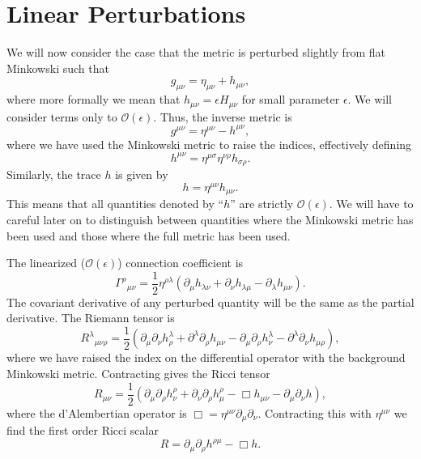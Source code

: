 \documentclass[a4paper, 11pt, titlepage, twoside]{report}
\newcommand{\order}[1]{\ensuremath{\mathcal{O}({#1})}}
\begin{document}
\section{Linear Perturbations}\label{sec:Lin}

We will now consider the case that the metric is perturbed slightly from flat Minkowski such that
\begin{equation}
g_{\mu\nu} = \eta_{\mu\nu} + h_{\mu\nu},
\end{equation}
where more formally we mean that $h_{\mu\nu} = \epsilon H_{\mu\nu}$ for small parameter $\epsilon$. We will consider terms only to $\order{\epsilon}$. Thus, the inverse metric is
\begin{equation}
g^{\mu\nu} = \eta^{\mu\nu} - h^{\mu\nu},
\end{equation}
where we have used the Minkowski metric to raise the indices, effectively defining
\begin{equation}
h^{\mu\nu} = \eta^{\mu\sigma}\eta^{\nu\rho}h_{\sigma\rho}.
\end{equation}
Similarly, the trace $h$ is given by
\begin{equation}
h = \eta^{\mu\nu}h_{\mu\nu}.
\end{equation}
This means that all quantities denoted by ``$h$'' are strictly $\order{\epsilon}$. We will have to careful later on to distinguish between quantities where the Minkowski metric has been used and those where the full metric has been used.

The linearized ($\order{\epsilon}$) connection coefficient is
\begin{equation}
{\Gamma^\rho}_{\mu\nu} = \frac{1}{2}\eta^{\rho\lambda}(\partial_\mu h_{\lambda\nu} + \partial_\nu h_{\lambda\mu} - \partial_\lambda h_{\mu\nu}).
\label{eq:Lin_Gamma}
\end{equation}
The covariant derivative of any perturbed quantity will be the same as the partial derivative. The Riemann tensor is
\begin{equation}
{R^\lambda}_{\mu\nu\rho} = \frac{1}{2}(\partial_\mu\partial_\nu h^\lambda_\rho + \partial^\lambda\partial_\rho h_{\mu\nu} - \partial_\mu\partial_\rho h^\lambda_\nu - \partial^\lambda\partial_\nu h_{\mu\rho}),
\label{eq:Lin_Riemann}
\end{equation}
where we have raised the index on the differential operator with the background Minkowski metric. Contracting gives the Ricci tensor
\begin{equation}
R_{\mu\nu} = \frac{1}{2}(\partial_\mu\partial_\rho h^\rho_\nu + \partial_\nu\partial_\rho h^\rho_\mu -\Box h_{\mu\nu} - \partial_\mu\partial_\nu h),
\label{eq:Ricci}
\end{equation}
where the d'Alembertian operator is $\Box = \eta^{\mu\nu}\partial_\mu\partial_\nu$. Contracting this with $\eta^{\mu\nu}$ we find the first order Ricci scalar
\begin{equation}
R = \partial_\mu\partial_\rho h^{\rho\mu} - \Box h.
\label{eq:Scalar}
\end{equation}
\end{document}
